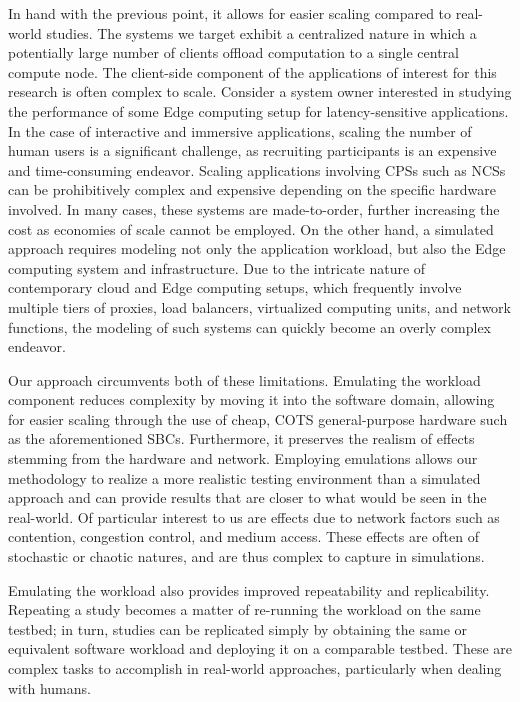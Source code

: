 In hand with the previous point, it allows for easier scaling compared to real-world studies.
The systems we target exhibit a centralized nature in which a potentially large number of clients offload computation to a single central compute node.
The client-side component of the applications of interest for this research is often complex to scale.
Consider a system owner interested in studying the performance of some Edge computing setup for latency-sensitive applications.
In the case of interactive and immersive applications, scaling the number of human users is a significant challenge, as recruiting participants is an expensive and time-consuming endeavor.
Scaling applications involving \glspl{CPS} such as \glspl{NCS} can be prohibitively complex and expensive depending on the specific hardware involved.
In many cases, these systems are made-to-order, further increasing the cost as economies of scale cannot be employed.
On the other hand, a simulated approach requires modeling not only the application workload, but also the Edge computing system and infrastructure.
Due to the intricate nature of contemporary cloud and Edge computing setups, which frequently involve multiple tiers of proxies, load balancers, virtualized computing units, and network functions, the modeling of such systems can quickly become an overly complex endeavor.

Our approach circumvents both of these limitations.
Emulating the workload component reduces complexity by moving it into the software domain, allowing for easier scaling through the use of cheap, \gls{COTS} general-purpose hardware such as the aforementioned \glspl{SBC}.
Furthermore, it preserves the realism of effects stemming from the hardware and network.
Employing emulations allows our methodology to realize a more realistic testing environment than a simulated approach and can provide results that are closer to what would be seen in the real-world.
Of particular interest to us are effects due to network factors such as contention, congestion control, and medium access.
These effects are often of stochastic or chaotic natures, and are thus complex to capture in simulations.

Emulating the workload also provides improved repeatability and replicability.
Repeating a study becomes a matter of re-running the workload on the same testbed;
in turn, studies can be replicated simply by obtaining the same or equivalent software workload and deploying it on a comparable testbed.
These are complex tasks to accomplish in real-world approaches, particularly when dealing with humans.

